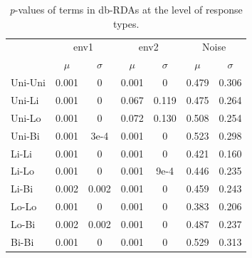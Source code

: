 		\begin{table}[h!]  
				
			\small
			\caption{\textit{p}-values of terms in db-RDAs at the level of response types.}
			\centering
				
			\begin{tabular}{@{}lcccccc@{}}
					
				\toprule
				& \multicolumn{2}{c}{env1} & \multicolumn{2}{c}{env2} & \multicolumn{2}{c}{Noise}\\\cmidrule(l){2-3} \cmidrule(l){4-5} \cmidrule(l){6-7}
				& $\mu$ & $\sigma$ & $\mu$ & $\sigma$ & $\mu$ & $\sigma$\\
				\hline
				Uni-Uni & 0.001 & 0 & 0.001 & 0 & 0.479 & 0.306\\
				Uni-Li& 0.001 & 0 & 0.067 & 0.119 & 0.475 & 0.264\\
				Uni-Lo& 0.001 & 0 & 0.072 & 0.130 & 0.508 & 0.254\\
				Uni-Bi& 0.001 & 3e-4 & 0.001 & 0 & 0.523 & 0.298\\
				Li-Li & 0.001 & 0 & 0.001 & 0 & 0.421 & 0.160\\
				Li-Lo & 0.001 & 0 & 0.001 & 9e-4 & 0.446 & 0.235\\
				Li-Bi & 0.002 & 0.002 & 0.001 & 0 & 0.459 & 0.243\\
				Lo-Lo & 0.001 & 0 & 0.001 & 0 & 0.383 & 0.206\\
				Lo-Bi & 0.002 & 0.002 & 0.001 & 0 & 0.487 & 0.237\\
				Bi-Bi & 0.001 & 0 & 0.001 & 0 & 0.529 & 0.313\\
				\toprule
					
			\end{tabular}
			
			\label{tab:dbsm1}
			
		\end{table}
		
